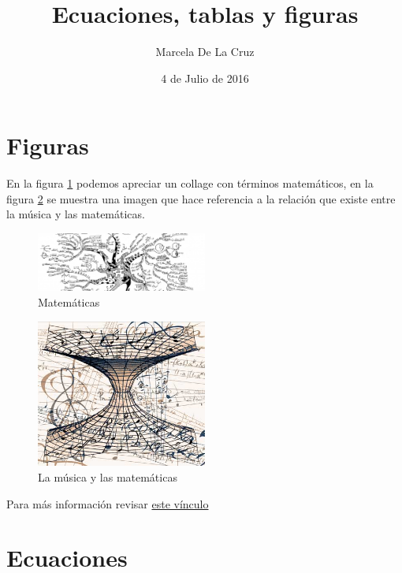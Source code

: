 \documentclass[twocolumn]{article}
\author{Marcela De La Cruz}
\date{4 de Julio de 2016}
\title{\sc Ecuaciones, tablas y figuras}
\begin{document}
\maketitle	
\thispagestyle{empty}
\section{Figuras} %
\label{sec:Figuras}


\blindtext

En la figura \ref{fig:ciencia} podemos apreciar un collage con t\'erminos matem\'aticos, en la figura \ref{fig:mus y mat} se muestra una imagen que hace referencia a la relaci\'on que existe entre la m\'usica y las matem\'aticas.


\begin{figure}[h]
	\centering
	\includegraphics[width=0.5\textwidth]{imagen1}
	\caption{Matem\'aticas}
	\label{fig:ciencia}
\end{figure}


\begin{figure}[h]
	\centering
	\includegraphics[width=0.5\textwidth]{musica-matematicas}
	\caption{La m\'usica y las matem\'aticas}
	\label{fig:mus y mat}
\end{figure}

Para m\'as informaci\'on revisar  \href{https://en.wikibooks.org/wiki/LaTeX/Floats,_Figures_and_Captions}{este v\'inculo}

\section{Ecuaciones} %
\label{sec:ecuaciones}
\end{document}
